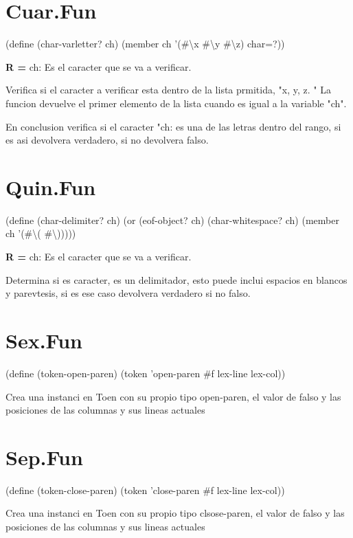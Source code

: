 \documentclass[letterpaper,12pt]{article}
\begin{document}
\section* {Cuar.Fun}
\text(define (char-varletter? ch)
  \text(member ch '(\#\backslash x \#\backslash y \#\backslash z) char=?))
\par
\textbf {R =} 
\text ch: Es el caracter que se va a verificar.\par
\text Verifica si el caracter a verificar esta dentro de la lista prmitida, "x, y, z. " La funcion devuelve el primer elemento de la lista cuando es igual a la variable "ch".\par
\text En conclusion verifica si el caracter "ch: es una de las letras dentro del rango, si es asi devolvera verdadero, si no devolvera falso.\par

\section* {Quin.Fun}
\text(define (char-delimiter? ch)
  \text(or (eof-object? ch)
     \text (char-whitespace? ch)
     \text (member ch '(\#\backslash( \#\backslash)))))
\par
\textbf {R =} 
\text ch: Es el caracter que se va a verificar.\par
\text Determina si es caracter, es un delimitador, esto puede inclui espacios en blancos y parevtesis, si es ese caso devolvera verdadero si no falso.\par

\section* {Sex.Fun}
(define (token-open-paren)
  (token 'open-paren \#f lex-line lex-col))\par
Crea una instanci en Toen con su propio tipo open-paren, el valor de falso y las posiciones de las columnas y sus lineas actuales\par

\section* {Sep.Fun}
(define (token-close-paren)
  (token 'close-paren \#f lex-line lex-col))\par
Crea una instanci en Toen con su propio tipo clsose-paren, el valor de falso y las posiciones de las columnas y sus lineas actuales\par
\end{document}
